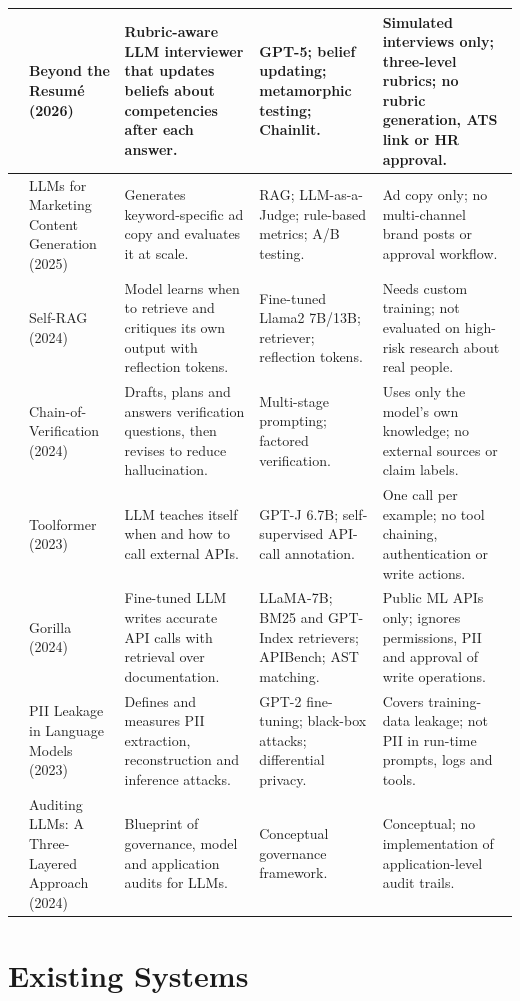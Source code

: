 {\begin{longtable}{|>{\raggedright\arraybackslash}p{0.75cm}|>{\raggedright\arraybackslash}p{2.6cm}|>{\raggedright\arraybackslash}p{3.75cm}|>{\raggedright\arraybackslash}p{3.0cm}|>{\raggedright\arraybackslash}p{3.4cm}|}
7 & Beyond the Resum\'e (2026) & Rubric-aware LLM interviewer that updates beliefs about competencies after each answer. & GPT-5; belief updating; metamorphic testing; Chainlit. & Simulated interviews only; three-level rubrics; no rubric generation, ATS link or HR approval.\\ \hline
8 & LLMs for Marketing Content Generation (2025) & Generates keyword-specific ad copy and evaluates it at scale. & RAG; LLM-as-a-Judge; rule-based metrics; A/B testing. & Ad copy only; no multi-channel brand posts or approval workflow.\\ \hline
9 & Self-RAG (2024) & Model learns when to retrieve and critiques its own output with reflection tokens. & Fine-tuned Llama2 7B/13B; retriever; reflection tokens. & Needs custom training; not evaluated on high-risk research about real people.\\ \hline
10 & Chain-of-Verification (2024) & Drafts, plans and answers verification questions, then revises to reduce hallucination. & Multi-stage prompting; factored verification. & Uses only the model's own knowledge; no external sources or claim labels.\\ \hline
11 & Toolformer (2023) & LLM teaches itself when and how to call external APIs. & GPT-J 6.7B; self-supervised API-call annotation. & One call per example; no tool chaining, authentication or write actions.\\ \hline
12 & Gorilla (2024) & Fine-tuned LLM writes accurate API calls with retrieval over documentation. & LLaMA-7B; BM25 and GPT-Index retrievers; APIBench; AST matching. & Public ML APIs only; ignores permissions, PII and approval of write operations.\\ \hline
13 & PII Leakage in Language Models (2023) & Defines and measures PII extraction, reconstruction and inference attacks. & GPT-2 fine-tuning; black-box attacks; differential privacy. & Covers training-data leakage; not PII in run-time prompts, logs and tools.\\ \hline
14 & Auditing LLMs: A Three-Layered Approach (2024) & Blueprint of governance, model and application audits for LLMs. & Conceptual governance framework. & Conceptual; no implementation of application-level audit trails.\\ \hline
\end{longtable}
}

\clearpage
\section{Existing Systems}


